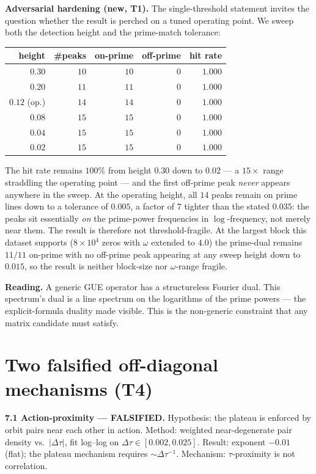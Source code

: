 \documentclass[11pt]{article}
\begin{document}
\textbf{Adversarial hardening (new, T1).} The single-threshold statement invites the question whether the result is perched on a tuned operating point. We sweep both the detection height and the prime-match tolerance:

\begin{center}
\begin{tabular}{rrrrr}
\toprule
height & \#peaks & on-prime & off-prime & hit rate \\
\midrule
$0.30$ & $10$ & $10$ & $0$ & $1.000$ \\
$0.20$ & $11$ & $11$ & $0$ & $1.000$ \\
$0.12$ (op.) & $14$ & $14$ & $0$ & $1.000$ \\
$0.08$ & $15$ & $15$ & $0$ & $1.000$ \\
$0.04$ & $15$ & $15$ & $0$ & $1.000$ \\
$0.02$ & $15$ & $15$ & $0$ & $1.000$ \\
\bottomrule
\end{tabular}
\end{center}

\noindent The hit rate remains $100\%$ from height $0.30$ down to $0.02$ --- a $15\times$ range straddling the operating point --- and the first off-prime peak \emph{never} appears anywhere in the sweep. At the operating height, all $14$ peaks remain on prime lines down to a tolerance of $0.005$, a factor of $7$ tighter than the stated $0.035$: the peaks sit essentially \emph{on} the prime-power frequencies in $\log$-frequency, not merely near them. The result is therefore not threshold-fragile. At the largest block this dataset supports ($8\times10^4$ zeros with $\omega$ extended to $4.0$) the prime-dual remains $11/11$ on-prime with no off-prime peak appearing at any sweep height down to $0.015$, so the result is neither block-size nor $\omega$-range fragile.

\textbf{Reading.} A generic GUE operator has a structureless Fourier dual. This spectrum's dual is a line spectrum on the logarithms of the prime powers --- the explicit-formula duality made visible. This is the non-generic constraint that any matrix candidate must satisfy.

\section{Two falsified off-diagonal mechanisms (T4)}

\textbf{7.1 Action-proximity --- FALSIFIED.} Hypothesis: the plateau is enforced by orbit pairs near each other in action. Method: weighted near-degenerate pair density vs.\ $|\Delta\tau|$, fit log--log on $\Delta\tau\in[0.002,0.025]$. Result: exponent $\mathbf{-0.01}$ (flat); the plateau mechanism requires $\sim\Delta\tau^{-1}$. Mechanism: $\tau$-proximity is not correlation.
\end{document}
